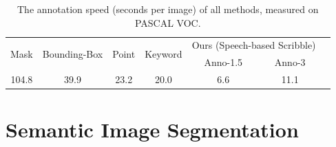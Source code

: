 
\begin{table}[tb]
   \centering \small
\setlength\tabcolsep{1.5mm} {
  \begin{tabular}{|c|c|c|c||c|c|c|}  \hline
       \multirow{2}{*}{Mask} & \multirow{2}{*}{Bounding-Box} & \multirow{2}{*}{Point}  & \multirow{2}{*}{Keyword} & \multicolumn{2}{c|}{Ours (Speech-based Scribble)}  \\ \cline{5-6}
         & & & & Anno-1.5 & Anno-3  \\   \cline{1-4}  \cline{5-6}
        104.8  & 39.9 &  23.2 & 20.0  &  6.6     & 11.1\\  \hline
       \end{tabular} }
       \caption{The annotation speed (seconds per image) of all methods, measured on PASCAL VOC.}
       \label{table:speed}  
\end{table}




\section{Semantic Image Segmentation}
\label{drawtell:sec:method}



